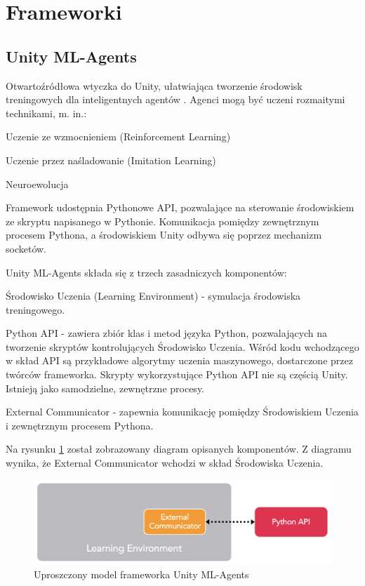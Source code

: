 \section{Frameworki}
\subsection{Unity ML-Agents}
\label{UnityMlaDescription}
Otwartoźródłowa wtyczka do Unity, ułatwiająca tworzenie środowisk treningowych dla inteligentnych agentów \cite{unitymla:overview}. Agenci mogą być uczeni rozmaitymi technikami, m. in.:
\begin{itemize*}
\item Uczenie ze wzmocnieniem (Reinforcement Learning)
\item Uczenie przez naśladowanie (Imitation Learning)
\item Neuroewolucja
\end{itemize*}
Framework udostępnia Pythonowe API, pozwalające na sterowanie środowiskiem ze skryptu napisanego w Pythonie. Komunikacja pomiędzy zewnętrznym procesem Pythona, a środowiskiem Unity odbywa się poprzez mechanizm socketów.

Unity ML-Agents składa się z trzech zasadniczych komponentów:
\begin{enumerate*}
\item Środowisko Uczenia (Learning Environment) - symulacja środowiska treningowego.
\item Python API - zawiera zbiór klas i metod języka Python, pozwalających na tworzenie skryptów kontrolujących Środowisko Uczenia. Wśród kodu wchodzącego w skład API są przykładowe algorytmy uczenia maszynowego, dostarczone przez twórców frameworka. Skrypty wykorzystujące Python API nie są częścią Unity. Istnieją jako samodzielne, zewnętrzne procesy.
\item External Communicator - zapewnia komunikację pomiędzy Środowiskiem Uczenia i zewnętrznym procesem Pythona.
\end{enumerate*}
Na rysunku \ref{UnityMlaBasicModel} został zobrazowany diagram opisanych komponentów.
Z diagramu wynika, że External Communicator wchodzi w skład Środowiska Uczenia.

\begin{figure}[h]
\begin{center}
\includegraphics[width=15cm]{resources/figures/unitymla_basic_architecture.png}
\caption{Uproszczony model frameworka Unity ML-Agents}
\label{UnityMlaBasicModel}
\end{center}
\end{figure}

